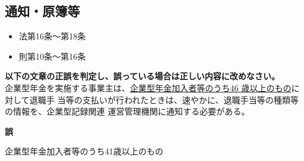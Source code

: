 \subsection{通知・原簿等}

\begin{InyouJobunbox}
  \begin{itemize}
    \item 法第16条〜第18条
    \item 則第10条〜第16条
  \end{itemize}
\end{InyouJobunbox}

\begin{truefalse}[年金1 2022 問題1(4)ア]
      \textbf{以下の文章の正誤を判定し、誤っている場合は正しい内容に改めなさい。}
\\  

  企業型年金を実施する事業主は、\underline{企業型年金加入者等のうち46 歳以上のもの}に対して退職手
当等の支払いが行われたときは、速やかに、退職手当等の種類等の情報を、企業型記録関連
運営管理機関に通知する必要がある。
\end{truefalse}

\begin{answerbox}
  \textbf{誤}

  企業型年金加入者等のうち41歳以上のもの
\end{answerbox}

\newpage